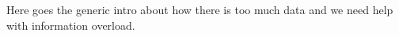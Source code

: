 \chapter*{}
Here goes the generic intro about how there is too much data and we need help with information overload.